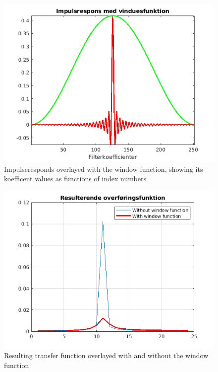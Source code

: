 \begin{figure}[h]
  \centering
  \includegraphics[scale=0.75]{matlabStuff/impulsresponds_with_window.png}
  \caption{Impulseresponds overlayed with the window function, showing its koefficent values as functions of index numbers}%
  \label{fig:impulserespondsWithWindow}
\end{figure}

\newpage

\begin{figure}[h]
  \centering
  \includegraphics[scale=0.65]{matlabStuff/resuting_transfer_function.png}
  \caption{Resulting transfer function overlayed with and without the window function}%
  \label{fig:resultingTransferFuntion}
\end{figure}

